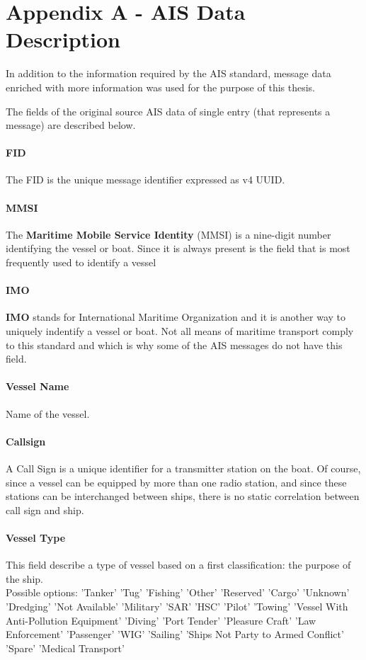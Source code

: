 \chapter{Appendix A - AIS Data Description}
\label{app:data-description}
In addition to the information required by the AIS standard, message data enriched with more information was used for the purpose of this thesis.
    
The fields of the original source AIS data of single entry (that represents a message) are described below.

\subsubsection{FID}
    The FID is the unique message identifier expressed as v4 UUID.
\subsubsection{MMSI}
    The \textbf{Maritime Mobile Service Identity} (MMSI) is a nine-digit number identifying the vessel or boat. Since it is always present is the field that is most frequently used to identify a vessel
\subsubsection{IMO}
    \textbf{IMO} stands for International Maritime Organization and it is another way to uniquely indentify a vessel or boat. Not all means of maritime transport comply to this standard and which is why some of the AIS messages do not have this field.
\subsubsection{Vessel Name}
    Name of the vessel.
\subsubsection{Callsign}
    A Call Sign is a unique identifier for a transmitter station on the boat. Of course, since a vessel can be equipped by more than one radio station, and since these stations can be interchanged between ships, there is no static correlation between call sign and ship.
\subsubsection{Vessel Type}
    This field describe a type of vessel based on a first classification: the purpose of the ship. \\
    Possible options: 'Tanker' 'Tug' 'Fishing' 'Other' 'Reserved' 'Cargo' 'Unknown' 'Dredging' 'Not Available' 'Military' 'SAR' 'HSC' 'Pilot' 'Towing' 'Vessel With Anti-Pollution Equipment' 'Diving' 'Port Tender' 'Pleasure Craft' 'Law Enforcement' 'Passenger' 'WIG' 'Sailing' 'Ships Not Party to Armed Conflict' 'Spare' 'Medical Transport'
